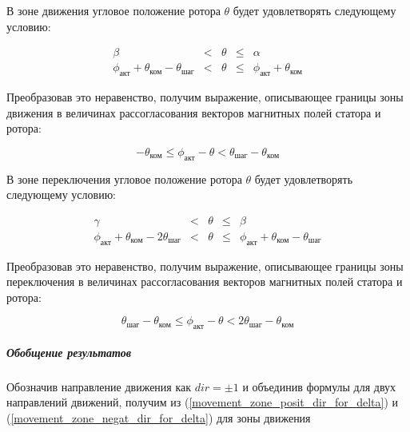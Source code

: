 В зоне движения угловое положение ротора $\theta$ будет удовлетворять следующему условию:

\begin{equation}
    \label{movement_zone_negat_dir_for_curr_pos}
    \begin{array}{ccccc}
        \beta & < & \theta & \leq & \alpha                                         \\
        \phi_\textit{акт} + \theta_\textit{ком} - \theta_\textit{шаг}
        & <     & \theta
        & \leq  &\phi_\textit{акт} + \theta_\textit{ком}
    \end{array}
\end{equation}

Преобразовав это неравенство, получим выражение, описывающее границы зоны движения
в величинах рассогласования векторов магнитных полей статора и ротора:

\begin{equation}
    \label{movement_zone_negat_dir_for_delta}
    -\theta_\textit{ком}
    \leq \phi_\textit{акт} - \theta
    < \theta_\textit{шаг} - \theta_\textit{ком}
\end{equation}

В зоне переключения угловое положение ротора $\theta$ будет удовлетворять следующему условию:

\begin{equation}
    \label{switch_zone_negat_dir_for_curr_pos}
    \begin{array}{ccccc}
        \gamma & < & \theta & \leq & \beta                                         \\
        \phi_\textit{акт} + \theta_\textit{ком} - 2\theta_\textit{шаг}
        & <     & \theta
        & \leq  & \phi_\textit{акт} + \theta_\textit{ком} - \theta_\textit{шаг}
    \end{array}
\end{equation}

Преобразовав это неравенство, получим выражение, описывающее границы зоны переключения
в величинах рассогласования векторов магнитных полей статора и ротора:

\begin{equation}
    \label{switch_zone_negat_dir_for_delta}
    \theta_\textit{шаг} - \theta_\textit{ком}
    \leq \phi_\textit{акт} - \theta
    < 2\theta_\textit{шаг} - \theta_\textit{ком}
\end{equation}


\subparagraph{Обобщение результатов}

Обозначив направление движения как $\textit{dir} = \pm 1$ и объединив формулы
для двух направлений движений, получим из (\ref{movement_zone_posit_dir_for_delta})
и (\ref{movement_zone_negat_dir_for_delta}) для зоны движения

